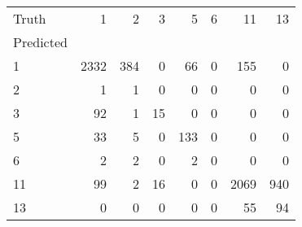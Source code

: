 \begin{tabular}{lrrrrrrr}
\toprule
Truth & 1 & 2 & 3 & 5 & 6 & 11 & 13 \\
Predicted &  &  &  &  &  &  &  \\
\midrule
1 & 2332 & 384 & 0 & 66 & 0 & 155 & 0 \\
2 & 1 & 1 & 0 & 0 & 0 & 0 & 0 \\
3 & 92 & 1 & 15 & 0 & 0 & 0 & 0 \\
5 & 33 & 5 & 0 & 133 & 0 & 0 & 0 \\
6 & 2 & 2 & 0 & 2 & 0 & 0 & 0 \\
11 & 99 & 2 & 16 & 0 & 0 & 2069 & 940 \\
13 & 0 & 0 & 0 & 0 & 0 & 55 & 94 \\
\bottomrule
\end{tabular}

